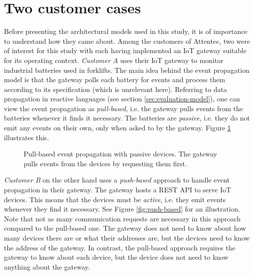 \section{Two customer cases}
\label{sec:customer-cases}

Before presenting the architectural models used in this study, it is of
importance to understand how they came about. Among the customers of Attentec,
two were of interest for this study with each having implemented an IoT gateway
suitable for its operating context. \textit{Customer A} uses their IoT gateway
to monitor industrial batteries used in forklifts. The main idea behind the
event propagation model is that the gateway polls each battery for events and
process them according to its specification (which is unrelevant here).
Referring to data propagation in reactive languages (see section
\ref{sec:evaluation-model}), one can view the event propagation as
\textit{pull-based}, i.e. the gateway pulls events from the batteries whenever
it finds it necessary. The batteries are \textit{passive}, i.e. they do not
emit any events on their own, only when asked to by the gateway. Figure
\ref{fig:pull-based} illustrates this.

\begin{figure}[h!]
    \centering
    \caption[Pull-based event propagation.]{Pull-based event propagation with
    passive devices. The gateway pulls events from the devices by requesting
    them first.}
    \label{fig:pull-based}
\end{figure}

\textit{Customer B} on the other hand uses a \textit{push-based} approach to
handle event propagation in their gateway. The gateway hosts a REST API to
serve IoT devices. This means that the devices must be \textit{active}, i.e.
they emit events whenever they find it necessary. See Figure
\ref{fig:push-based} for an illustration. Note that not as many communication
requests are necessary in this approach compared to the pull-based one. The
gateway does not need to know about how many devices there are or what their
addresses are, but the devices need to know the address of the gateway. In
contrast, the pull-based approach requires the gateway to know about each
device, but the device does not need to know anything about the gateway.

